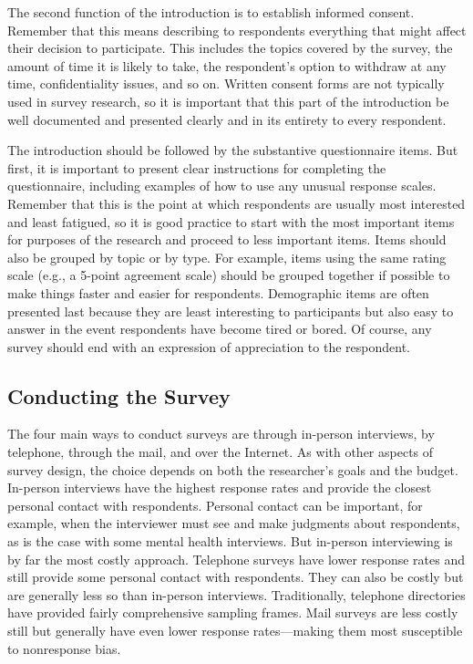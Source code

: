 \documentclass[
]{krantz}
\begin{document}
The second function of the introduction is to establish informed consent. Remember that this means describing to respondents everything that might affect their decision to participate. This includes the topics covered by the survey, the amount of time it is likely to take, the respondent's option to withdraw at any time, confidentiality issues, and so on. Written consent forms are not typically used in survey research, so it is important that this part of the introduction be well documented and presented clearly and in its entirety to every respondent.

The introduction should be followed by the substantive questionnaire items. But first, it is important to present clear instructions for completing the questionnaire, including examples of how to use any unusual response scales. Remember that this is the point at which respondents are usually most interested and least fatigued, so it is good practice to start with the most important items for purposes of the research and proceed to less important items. Items should also be grouped by topic or by type. For example, items using the same rating scale (e.g., a 5-point agreement scale) should be grouped together if possible to make things faster and easier for respondents. Demographic items are often presented last because they are least interesting to participants but also easy to answer in the event respondents have become tired or bored. Of course, any survey should end with an expression of appreciation to the respondent.

\subsection*{Conducting the Survey}\label{conducting-the-survey}


The four main ways to conduct surveys are through in-person interviews, by telephone, through the mail, and over the Internet. As with other aspects of survey design, the choice depends on both the researcher's goals and the budget. In-person interviews have the highest response rates and provide the closest personal contact with respondents. Personal contact can be important, for example, when the interviewer must see and make judgments about respondents, as is the case with some mental health interviews. But in-person interviewing is by far the most costly approach. Telephone surveys have lower response rates and still provide some personal contact with respondents. They can also be costly but are generally less so than in-person interviews. Traditionally, telephone directories have provided fairly comprehensive sampling frames. Mail surveys are less costly still but generally have even lower response rates---making them most susceptible to nonresponse bias.
\end{document}
